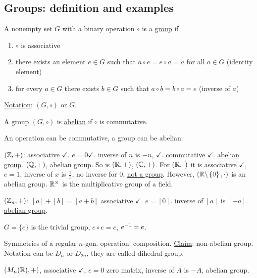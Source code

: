\documentclass[]{article}
\begin{document}
\subsection{Groups: definition and examples}

\begin{definition}
	A nonempty set $G$ with a binary operation $\circ$ is a \ul{group} if
	\begin{enumerate}
		\item $\circ$ is associative
		\item there exists an element $e\in G$ such that $a\circ e = e\circ a = a$ for all $a\in G$ (identity element)
		\item for every $a\in G$ there exists $b\in G$ such that $a\circ b = b\circ a = e$ (inverse of $a$)
	\end{enumerate}
	\ul{Notation}: $(G,\circ)$ or $G$.
\end{definition}
\begin{definition}
	A group $(G,\circ)$ is \ul{abelian} if $\circ$ is commutative.
\end{definition}
\begin{remark}
	An operation can be commutative, a group can be abelian.
\end{remark}
\begin{example}
	$(\mathbb{Z},+)$: associative $\checkmark$. $e=0 \checkmark$. inverse of $n$ is $-n$, $\checkmark$. commutative $\checkmark$. \ul{abelian group}.
	$(\mathbb{Q}, +)$, abelian group. So is $(\mathbb{R},+)$, $(\mathbb{C},+)$. For $(\mathbb{R},\cdot)$ it is associative $\checkmark$, $e=1$, inverse of $x$ is $\frac{1}{x}$, no inverse for 0, \ul{not a group}. However, $(\mathbb{R}\backslash \left\{ 0 \right\},\cdot)$ is an abelian group. $\mathbb{R}^\times$ is the multiplicative group of a field.
\end{example}
\begin{example}
	$(\mathbb{Z}_n,+)$: $[a]+[b] = [a+b]$ associative $\checkmark$. $e=[0]$. inverse of $[a]$ is $[-a]$. \ul{abelian group}.
\end{example}
\begin{example}
	$G = \{e\}$ is the trivial group, $e\circ e = e$, $e^{-1} = e$.
\end{example}
\begin{example}
	Symmetries of a regular $n$-gon. operation: composition. \ul{Claim}: non-abelian group. Notation can be $D_n$ or $D_{2n}$, they are called dihedral group.
\end{example}
\begin{example}
	$(M_n(\mathbb{R}),+)$, associative $\checkmark$, $e=0$ zero matrix, inverse of $A$ is $-A$, abelian group.
\end{example}
\end{document}
